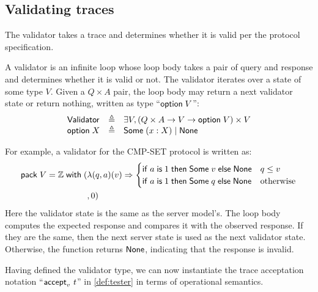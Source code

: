 \subsection{Validating traces}
The validator takes a trace and determines whether it is valid per the protocol
specification.

\begin{definition}[Validator]
A validator is an infinite loop whose loop body takes a pair of query and
response and determines whether it is valid or not.  The validator iterates over
a state of some type $V$.  Given a $Q\times A$ pair, the loop body may return a
next validator state or return nothing, written as type ``$\mathsf{option}\; V$'':
\[\begin{array}{lll}
  \mathsf{Validator}&\triangleq&\exists V,(Q\times A\to V\to\mathsf{option}\; V)\times V\\
  \mathsf{option}\; X&\triangleq&\mathsf{Some}\;(x:X)\mid\mathsf{None}
\end{array}\]
\end{definition}

For example, a validator for the CMP-SET protocol is written as:
\begin{align*}
  \mathsf{pack}\;V=\mathbb Z\;\mathsf{with}\;(&\lambda(q,a)(v)\Rightarrow
      \begin{cases}
        \mathsf{if}\; a\;\mathsf{is}\; 1\;\mathsf{then}\;\mathsf{Some}\;v\;\mathsf{else}\;\mathsf{None}&q\le v\\
        \mathsf{if}\; a\;\mathsf{is}\; 1\;\mathsf{then}\;\mathsf{Some}\;q\;\mathsf{else}\;\mathsf{None}&\mathrm{otherwise}
      \end{cases}
   \\
    &,0)
\end{align*}
Here the validator state is the same as the server model's.  The loop body computes
the expected response and compares it with the observed response.  If they are
the same, then the next server state is used as the next validator state.
Otherwise, the function returns $\mathsf{None}$, indicating that the response is
invalid.

Having defined the validator type, we can now instantiate the trace acceptation
notation ``$\mathsf{accept}_{v}~{t}$'' in \autoref{def:tester} in terms of operational
semantics.


